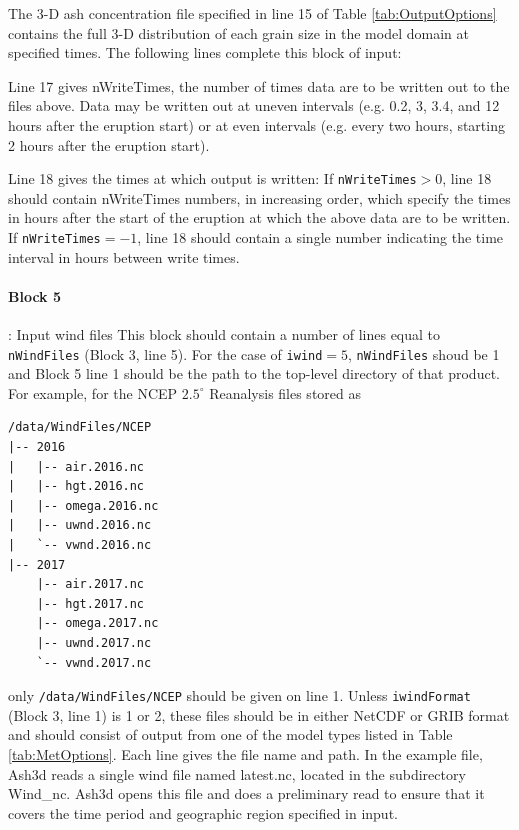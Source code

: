 The 3-D ash concentration file specified in line 15 of Table \ref{tab:OutputOptions}
contains the full
3-D distribution of each grain size in the model domain at specified times.
The following lines complete this block of input:

Line 17 gives nWriteTimes, the number of times data are to be written out to the
files above. Data may be written out at uneven intervals (e.g. 0.2, 3, 3.4, and
12 hours after the eruption start) or at even intervals (e.g. every two hours,
starting 2 hours after the eruption start).

Line 18 gives the times at which output is written:
If \texttt{nWriteTimes}$>0$, line 18 should contain nWriteTimes numbers, in increasing order,
which specify the times in hours after the start of the eruption at which the above
data are to be written.
If \texttt{nWriteTimes}$=-1$, line 18 should contain a single number indicating the time
interval in hours between write times.

\paragraph{Block 5}: Input wind files
This block should contain a number of lines equal to \texttt{nWindFiles} (Block 3, line 5).
For the case of \texttt{iwind}$=5$, \texttt{nWindFiles} shoud be 1 and Block 5 line 1
should be the path to the top-level directory of that product.  For example, for the
NCEP $2.5^{\circ}$ Reanalysis files stored as
\begin{verbatim}
/data/WindFiles/NCEP
|-- 2016
|   |-- air.2016.nc
|   |-- hgt.2016.nc
|   |-- omega.2016.nc
|   |-- uwnd.2016.nc
|   `-- vwnd.2016.nc
|-- 2017
    |-- air.2017.nc
    |-- hgt.2017.nc
    |-- omega.2017.nc
    |-- uwnd.2017.nc
    `-- vwnd.2017.nc
\end{verbatim}
only \texttt{/data/WindFiles/NCEP} should be given on line 1.
Unless \texttt{iwindFormat} (Block 3, line 1) is 1 or 2, these files should be in
either NetCDF or GRIB
format and should consist of output from one of the model types listed in
Table \ref{tab:MetOptions}.
Each line gives the file name and path. In the example file, Ash3d reads a single
wind file named latest.nc, located in the subdirectory Wind\_nc. Ash3d opens this
file and does a preliminary read to ensure that it covers the time period and
geographic region specified in input.

